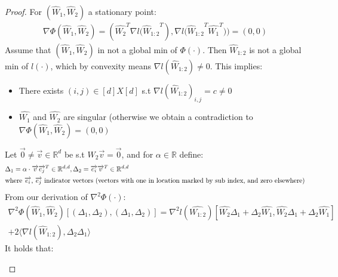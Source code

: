 \documentclass[12pt]{article}
\begin{document}
    \begin{proof}
    For $({\widehat{W}_1}, {\widehat{W}_2})$ a stationary point:
    \begin{align*}
        {\nabla\Phi}{({\widehat{W}_1}, {\widehat{W}_2})}
        =
        ({\widehat{W_2}^T} {\nabla{l}{({\widehat{W}_{1:2}}}^T}),
        {\nabla{l}{({\widehat{W}_{1:2}}}^T}{\widehat{W_1}^T}))
        =
        (0, 0)
    \end{align*}
    Assume that $({\widehat{W}_1}, {\widehat{W}_2})$ in not a global min of $\Phi(\cdot)$. Then ${\widehat{W}_{1:2}}$ is not a global min of $l(\cdot)$, which by convexity means ${\nabla{l}}{({\widehat{W}_{1:2}})} \neq 0$. This implies:
    \\
    \begin{itemize}
        \item There exists $(i, j) \in [d]X[d]$ s.t ${{\nabla{l}}{({\widehat{W}_{1:2}})}_{i,j}}
        = c \neq 0$
        \item $\widehat{W_1}$ and $\widehat{W_2}$ are singular (otherwise we obtain a contradiction to ${\nabla\Phi}{({\widehat{W}_1}, {\widehat{W}_2})} = (0,0)$
    \end{itemize}
    Let $\overrightarrow{0} \neq \overrightarrow{v} \in {\mathbb{R}^d}$ be s.t ${W_2}\overrightarrow{v} = \overrightarrow{0}$, and for $\alpha \in \mathbb{R}$ define:
    \begin{align*}
        \Delta_1 = \alpha \cdot \overrightarrow{v} {\overrightarrow{e_j}^T} \in {\mathbb{R}^{d,d}},
        \Delta_2 = \overrightarrow{e_i} {\overrightarrow{v}^T} \in {\mathbb{R}^{d,d}}
        \\
        \intertext{where $\overrightarrow{e_i}$,  $\overrightarrow{e_j}$ indicator vectors (vectors with one in location marked by sub index, and zero elsewhere)}
    \end{align*}
    From our derivation of ${\nabla^2}{\Phi(\cdot)}$:
    \begin{align*}
        {{\nabla}^{2}}{\Phi{({\widehat{W}_1}, {\widehat{W}_2})}}[
        (\Delta_1,\Delta_2),
        (\Delta_1,\Delta_2)
        ]
        =
        {{\nabla}^{2}}{l}(\widehat{W_{1:2}})[
         \widehat{W_2}{\Delta_1} + {\Delta_2}\widehat{W_1},
         \widehat{W_2}{\Delta_1} + {\Delta_2}\widehat{W_1}
        ]
        \\
        +
        2 \langle
        {\nabla{l}}{({\widehat{W}_{1:2}})}
        ,
        \Delta_2 \Delta_1
        \rangle
    \end{align*}
    It holds that:
    \begin{itemize}

\end{itemize}
\end{proof}
\end{document}
